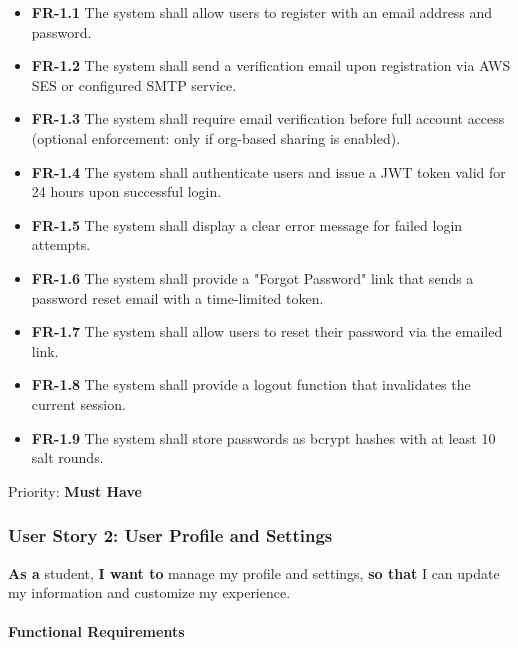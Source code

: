 \documentclass[12pt,a4paper]{article}
\begin{document}
\begin{itemize}
    \item \textbf{FR-1.1} The system shall allow users to register with an email address and password.
    \item \textbf{FR-1.2} The system shall send a verification email upon registration via AWS SES or configured SMTP service.
    \item \textbf{FR-1.3} The system shall require email verification before full account access (optional enforcement: only if org-based sharing is enabled).
    \item \textbf{FR-1.4} The system shall authenticate users and issue a JWT token valid for 24 hours upon successful login.
    \item \textbf{FR-1.5} The system shall display a clear error message for failed login attempts.
    \item \textbf{FR-1.6} The system shall provide a "Forgot Password" link that sends a password reset email with a time-limited token.
    \item \textbf{FR-1.7} The system shall allow users to reset their password via the emailed link.
    \item \textbf{FR-1.8} The system shall provide a logout function that invalidates the current session.
    \item \textbf{FR-1.9} The system shall store passwords as bcrypt hashes with at least 10 salt rounds.
\end{itemize}

Priority: \textbf{Must Have}

\subsubsection{User Story 2: User Profile and Settings}

\textbf{As a} student, \textbf{I want to} manage my profile and settings, \textbf{so that} I can update my information and customize my experience.

\paragraph{Functional Requirements}
\end{document}
